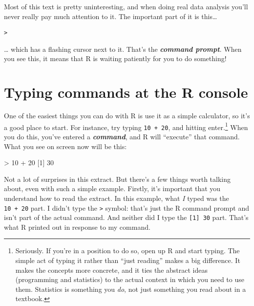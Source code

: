 \documentclass[
]{book}
\newenvironment{Shaded}{\begin{snugshade}}{\end{snugshade}}
\newcommand{\DecValTok}[1]{\textcolor[rgb]{0.00,0.00,0.81}{#1}}
\newcommand{\NormalTok}[1]{#1}
\newcommand{\SpecialCharTok}[1]{\textcolor[rgb]{0.00,0.00,0.00}{#1}}
\begin{document}
Most of this text is pretty uninteresting, and when doing real data analysis you'll never really pay much attention to it. The important part of it is this\ldots{}

\begin{verbatim}
>
\end{verbatim}

\ldots{} which has a flashing cursor next to it. That's the \textbf{\emph{command prompt}}. When you see this, it means that R is waiting patiently for you to do something!

\hypertarget{firstcommand}{%
\section{Typing commands at the R console}\label{firstcommand}}

One of the easiest things you can do with R is use it as a simple calculator, so it's a good place to start. For instance, try typing \texttt{10\ +\ 20}, and hitting enter.\footnote{Seriously. If you're in a position to do so, open up R and start typing. The simple act of typing it rather than ``just reading'' makes a big difference. It makes the concepts more concrete, and it ties the abstract ideas (programming and statistics) to the actual context in which you need to use them. Statistics is something you \emph{do}, not just something you read about in a textbook.} When you do this, you've entered a \textbf{\emph{command}}, and R will ``execute'' that command. What you see on screen now will be this:

\begin{Shaded}
\begin{Highlighting}[]
\SpecialCharTok{\textgreater{}} \DecValTok{10} \SpecialCharTok{+} \DecValTok{20}
\NormalTok{[}\DecValTok{1}\NormalTok{] }\DecValTok{30}
\end{Highlighting}
\end{Shaded}

Not a lot of surprises in this extract. But there's a few things worth talking about, even with such a simple example. Firstly, it's important that you understand how to read the extract. In this example, what \emph{I} typed was the \texttt{10\ +\ 20} part. I didn't type the \texttt{\textgreater{}} symbol: that's just the R command prompt and isn't part of the actual command. And neither did I type the \texttt{{[}1{]}\ 30} part. That's what R printed out in response to my command.
\end{document}
